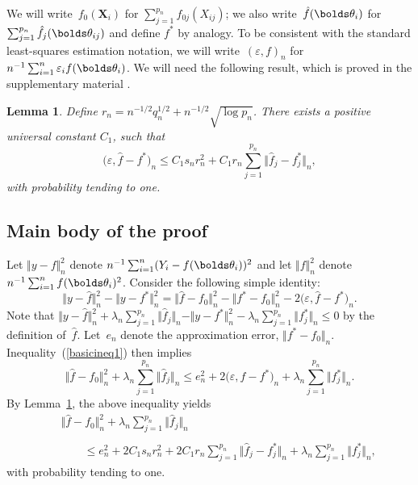 \documentclass[aos,MSNbibl,dvips]{arximspdf}
\newcommand{\rrVert}{\Vert}
\newcommand{\llVert}{\Vert}
\newtheorem{lemma}{Lemma}
\newcommand{\btheta}{\bolds\theta}
\newcommand{\bX}{{\mathbf X}}
\begin{document}
\begin{appendix}
We will write~$f_0(\bX_i)$ for $\sum_{j=1}^{{p_n}} f_{0j}(X_{ij})$;
we also write~$\hat f(\btheta_i)$ for $\sum_{j=1}^{{p_n}}\hat f_j(\btheta_{ij})$ and define $f^*$ by analogy. To be consistent with
the standard least-squares estimation notation, we will
write~$(\varepsilon,f)_n$ for $n^{-1}\sum_{i=1}^n\varepsilon_i
f(\btheta_{i})$. We will need the following result, which is proved in
the supplementary material \cite{FAR}.


%
\begin{lemma}
\label{lementrcons}
Define $r_n=n^{-1/2}q_n^{1/2}+n^{-1/2}\sqrt{\log{p_n}}$.
There exists a positive universal constant $C_1$, such that
%
\begin{equation}
\bigl(\varepsilon,\hat f-f^*\bigr)_n\le C_1s_nr_n^2+C_1r_n
\sum_{j=1}^{p_n}\bigl\llVert\hat f_j - f_j^*\bigr\rrVert_n,
\end{equation}
%
with probability tending to one.
\end{lemma}

\subsection{Main body of the proof}

Let $\llVert y-f\rrVert ^2_n$ denote $n^{-1}\sum_{i=1}^n(Y_i-f(\btheta
_{i}))^2$
and let $\llVert f\rrVert ^2_n$ denote $n^{-1}\sum_{i=1}^n f(\btheta_{i})^2$.
Consider the following simple identity:
%
\begin{equation}
\label{basicineq1} \llVert y-\hat f\rrVert_n^2-\bigl
\llVert y-f^*\bigr\rrVert_n^2=\llVert\hat f-f_0\rrVert_n^2-\bigl\llVert
f^*-f_0\bigr\rrVert_n^2-2\bigl(\varepsilon,
\hat f - f^*\bigr)_n.
\end{equation}
%
Note that $\llVert y-\hat f\rrVert _n^2+\lambda_n\sum
_{j=1}^{p_n}\llVert \hat f_j\rrVert _n-\llVert y-f^*\rrVert _n^2-\lambda_n\sum
_{j=1}^{p_n}\llVert f_j^*\rrVert _n\le0$ by
the definition of~$\hat f$. Let~$e_n$ denote the approximation
error, $\llVert f^* - f_0\rrVert _n$. Inequality~(\ref{basicineq1})
then implies
%
\[
\llVert\hat f-f_0\rrVert_n^2+
\lambda_n\sum_{j=1}^{p_n}\llVert
\hat f_j\rrVert_n\le e_n^2+2
\bigl(\varepsilon,\hat f - f^*\bigr)_n+\lambda_n\sum
_{j=1}^{p_n}\bigl\llVert f_j^*
\bigr\rrVert_n.
\]
%
By Lemma~\ref{lementrcons}, the above inequality yields
%
\begin{eqnarray}\label{basicineq1b}
&& \llVert\hat f-f_0\rrVert_n^2+
\lambda_n\sum_{j=1}^{p_n}\llVert
\hat f_j\rrVert_n
\nonumber\\[-10pt]\\[-10pt]\nonumber
&&\qquad \le e_n^2+2C_1s_nr_n^2+2C_1r_n
\sum_{j=1}^{p_n}\bigl\llVert\hat f_j - f_j^*\bigr\rrVert_n+
\lambda_n\sum_{j=1}^{p_n}\bigl
\llVert f_j^*\bigr\rrVert_n,
\end{eqnarray}
%
with probability tending to one.


\end{appendix}
\end{document}
